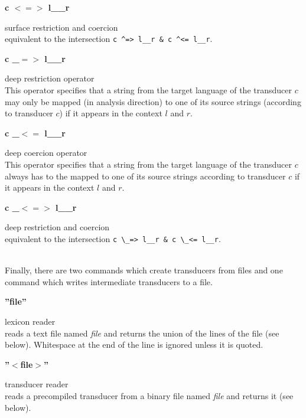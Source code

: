 \documentclass{article}
\begin{document}
\parbox[t]{2.7cm}{\textbf{c $<=>$ l\_\_r}}
\begin{minipage}[t]{11.3cm}
  surface restriction and coercion\\
  equivalent to the intersection
  \verb#c ^=> l__r & c ^<= l__r#.
\end{minipage}
  

\parbox[t]{2.7cm}{\textbf{c \_$=>$ l\_\_r}}
\begin{minipage}[t]{11.3cm}
  deep restriction operator\\
  This operator specifies that a string from the target language of
  the transducer $c$ may only be mapped (in analysis direction) to one
  of its source strings (according to transducer $c$) if it appears in
  the context $l$ and $r$.
\end{minipage}
  
\parbox[t]{2.7cm}{\textbf{c \_$<=$ l\_\_r}}
\begin{minipage}[t]{11.3cm}
  deep coercion operator\\
  This operator specifies that a string from the target language of
  the transducer $c$ always has to the mapped to one of its source
  strings according to transducer $c$ if it appears in the context
  $l$ and $r$.
\end{minipage}
  
\parbox[t]{2.7cm}{\textbf{c \_$<=>$ l\_\_r}}
\begin{minipage}[t]{11.3cm}
  deep restriction and coercion\\
  equivalent to the intersection \verb#c \_=> l__r & c \_<= l__r#.
\end{minipage}\\
  

\noindent
Finally, there are two commands which create transducers from files
and one command which writes intermediate transducers to a file.

\parbox[t]{2cm}{\textbf{''file''}}
\begin{minipage}[t]{10cm}
  lexicon reader\\
  reads a text file named \emph{file} and returns the union of
  the lines of the file (see below). Whitespace at the end of the line
  is ignored unless it is quoted.
\end{minipage}

\parbox[t]{2cm}{\textbf{''$<$file$>$''}}
\begin{minipage}[t]{10cm}
  transducer reader\\
  reads a precompiled transducer from a binary file named \emph{file}
  and returns it (see below).
\end{minipage}
\end{document}

